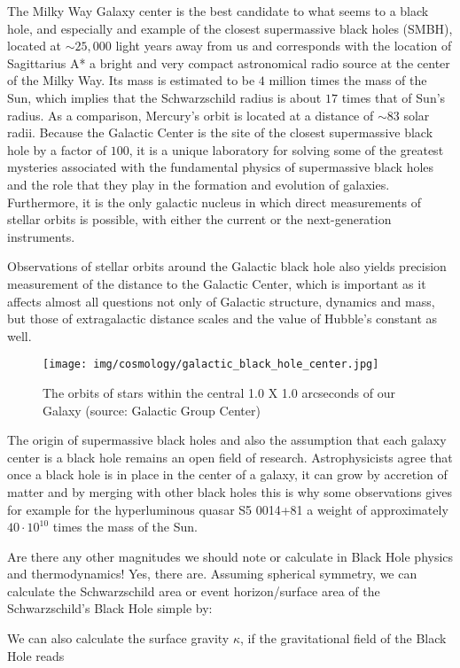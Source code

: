 	The Milky Way Galaxy center is the best candidate to what seems to a black hole, and especially and example of the closest supermassive black holes (SMBH), located at $\sim 25,000$ light years away from us and corresponds with the location of Sagittarius A* a bright and very compact astronomical radio source at the center of the Milky Way. Its mass is estimated to be $4$ million times the mass of the Sun, which implies that the Schwarzschild radius is about $17$ times that of Sun's radius. As a comparison, Mercury's orbit is located at a distance of $\sim 83$ solar radii. Because the Galactic Center is the site of the closest supermassive black hole by a factor of $100$, it is a unique laboratory for solving some of the greatest mysteries associated with the fundamental physics of supermassive black holes and the role that they play in the formation and evolution of galaxies. Furthermore, it is the only galactic nucleus in which direct measurements of stellar orbits is possible, with either the current or the next-generation instruments.
	
	Observations of stellar orbits around the Galactic black hole also yields precision measurement of the distance to the Galactic Center, which is important as it affects almost all questions not only of Galactic structure, dynamics and mass, but those of extragalactic distance scales and the value of Hubble's constant as well.
	\begin{figure}[H]
		\centering
		\texttt{[image: img/cosmology/galactic\_black\_hole\_center.jpg]}	
		\caption{The orbits of stars within the central 1.0 X 1.0 arcseconds of our Galaxy (source: Galactic Group Center)}
	\end{figure}
	The origin of supermassive black holes  and also the assumption that each galaxy center is a black hole remains an open field of research. Astrophysicists agree that once a black hole is in place in the center of a galaxy, it can grow by accretion of matter and by merging with other black holes this is why some observations gives for example for the hyperluminous quasar S5 0014+81 a weight of approximately $40\cdot 10^10$ times the mass of the Sun.
	
	Are there any other magnitudes we should note or calculate in Black Hole physics and thermodynamics! Yes, there are. Assuming spherical symmetry, we can calculate the Schwarzschild area or event horizon/surface area of the Schwarzschild's Black Hole simple by:
   
	We can also calculate the surface gravity $\kappa$, if the gravitational field of the Black Hole reads
	
